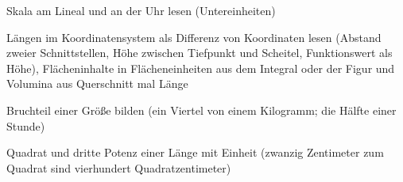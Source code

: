 \begin{aufgabe}{Skala am Lineal und an der Uhr lesen (Untereinheiten)}
\end{aufgabe}

\begin{aufgabe}{Längen im Koordinatensystem als Differenz von Koordinaten lesen (Abstand zweier Schnittstellen, Höhe zwischen Tiefpunkt und Scheitel, Funktionswert als Höhe), Flächeninhalte in Flächeneinheiten aus dem Integral oder der Figur und Volumina aus Querschnitt mal Länge}
\end{aufgabe}

\begin{aufgabe}{Bruchteil einer Größe bilden (ein Viertel von einem Kilogramm; die Hälfte einer Stunde)}
\end{aufgabe}

\begin{aufgabe}{Quadrat und dritte Potenz einer Länge mit Einheit (zwanzig Zentimeter zum Quadrat sind vierhundert Quadratzentimeter)}
\end{aufgabe}

